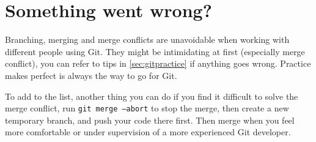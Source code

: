 \section{Something went wrong?}

Branching, merging and merge conflicts are unavoidable when working with different people using Git. They might be intimidating at first (especially merge conflict), you can refer to tips in \cref{sec:gitpractice} if anything goes wrong. Practice makes perfect is always the way to go for Git. 

To add to the list, another thing you can do if you find it difficult to solve the merge conflict, run \texttt{git merge --abort} to stop the merge, then create a new temporary branch, and push your code there first. Then merge when you feel more comfortable or under supervision of a more experienced Git developer.

